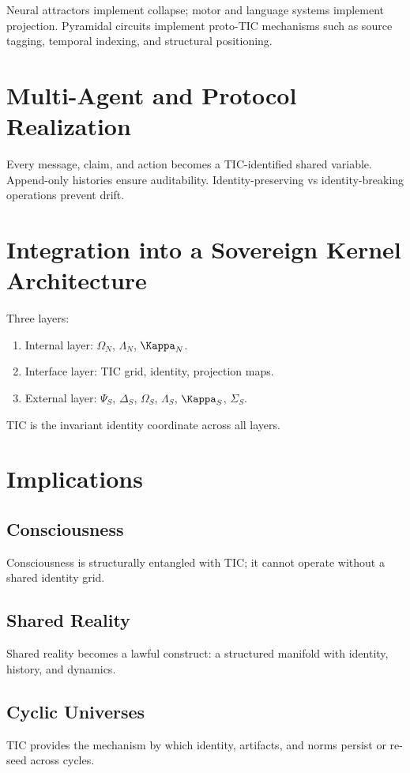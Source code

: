 \documentclass[11pt]{article}
\begin{document}
Neural attractors implement collapse; motor and language systems implement projection. Pyramidal circuits implement proto-TIC mechanisms such as source tagging, temporal indexing, and structural positioning.

\section{Multi-Agent and Protocol Realization}

Every message, claim, and action becomes a TIC-identified shared variable. Append-only histories ensure auditability. Identity-preserving vs identity-breaking operations prevent drift.

\section{Integration into a Sovereign Kernel Architecture}

Three layers:

\begin{enumerate}
    \item Internal layer: $\Omega_N$, $\Lambda_N$, $\Kappa_N$.
    \item Interface layer: TIC grid, identity, projection maps.
    \item External layer: $\Psi_S$, $\Delta_S$, $\Omega_S$, $\Lambda_S$, $\Kappa_S$, $\Sigma_S$.
\end{enumerate}

TIC is the invariant identity coordinate across all layers.

\section{Implications}

\subsection{Consciousness}
Consciousness is structurally entangled with TIC; it cannot operate without a shared identity grid.

\subsection{Shared Reality}
Shared reality becomes a lawful construct: a structured manifold with identity, history, and dynamics.

\subsection{Cyclic Universes}
TIC provides the mechanism by which identity, artifacts, and norms persist or re-seed across cycles.
\end{document}
